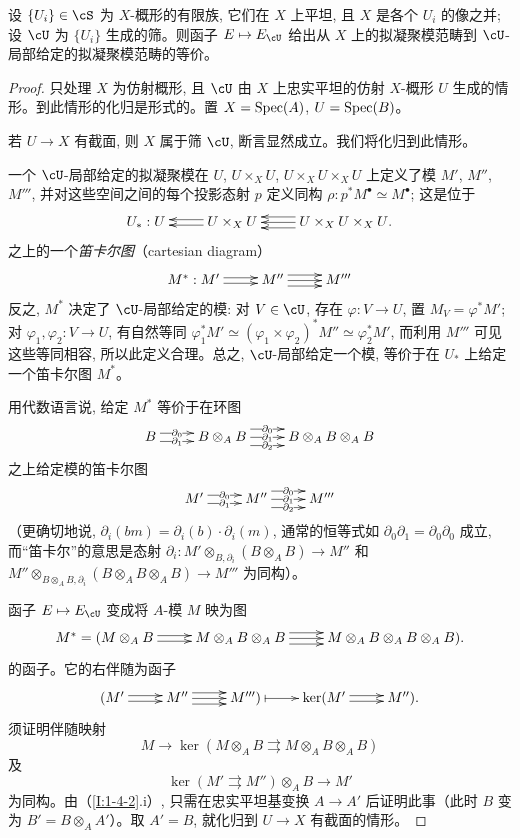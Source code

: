 \begin{theorem}\label{I:1-4-5}
设 $\{U_i\}\in\cS$ 为 $X$-概形的有限族, 它们在 $X$ 上平坦, 且 $X$ 是各个 $U_i$ 的像之并; 设 $\cU$ 为 $\{U_i\}$ 生成的筛。则函子 $E\mapsto E_\cU$ 给出从 $X$ 上的拟凝聚模范畴到 $\cU$-局部给定的拟凝聚模范畴的等价。
\end{theorem}
\begin{proof}
只处理 $X$ 为仿射概形, 且 $\cU$ 由 $X$ 上忠实平坦的仿射 $X$-概形 $U$ 生成的情形。到此情形的化归是形式的。置 $X=\operatorname{Spec}(A)$, $U=\operatorname{Spec}(B)$。

若 $U\to X$ 有截面, 则 $X$ 属于筛 $\cU$, 断言显然成立。我们将化归到此情形。

一个 $\cU$-局部给定的拟凝聚模在 $U$, $U\times_XU$, $U\times_XU\times_XU$ 上定义了模 $M'$, $M''$, $M'''$, 并对这些空间之间的每个投影态射 $p$ 定义同构 $\rho:p^*M^\bullet\simeq M^\bullet$; 这是位于
\[\xymatrix{
  U_* : U
    & U\times_X U \ar@<2pt>[l] \ar@<-2pt>[l]
    & U\times_X U\times_X U \ar[l] \ar@<4pt>[l] \ar@<-4pt>[l] \mbox{.}
}\]
之上的一个\emph{笛卡尔图}（cartesian diagram）
\[\xymatrix{
  M^* : M' \ar@<2pt>[r] \ar@<-2pt>[r]
    & M'' \ar[r] \ar@<4pt>[r] \ar@<-4pt>[r]
    & M'''
}\]
反之, $M^*$ 决定了 $\cU$-局部给定的模: 对 $V\in\cU$, 存在 $\varphi:V\to U$, 置 $M_V=\varphi^*M'$; 对 $\varphi_1,\varphi_2:V\to U$, 有自然等同 $\varphi_1^*M'\simeq(\varphi_1\times\varphi_2)^*M''\simeq\varphi_2^*M'$, 而利用 $M'''$ 可见这些等同相容, 所以此定义合理。总之, $\cU$-局部给定一个模, 等价于在 $U_*$ 上给定一个笛卡尔图 $M^*$。

用代数语言说, 给定 $M^*$ 等价于在环图
\[\xymatrix{
  B \ar@<3pt>[r]|-{\partial_0} \ar@<-3pt>[r]|-{\partial_1}
    & B\otimes_A B \ar@<6pt>[r]|-{\partial_0} \ar[r]|-{\partial_1} \ar@<-6pt>[r]|-{\partial_2}
    & B\otimes_A B\otimes_A B
}\]
之上给定模的笛卡尔图
\[\xymatrix{
  M' \ar@<3pt>[r]|-{\partial_0} \ar@<-3pt>[r]|-{\partial_1}
    & M'' \ar@<6pt>[r]|-{\partial_0} \ar[r]|-{\partial_1} \ar@<-6pt>[r]|-{\partial_2}
    & M'''
}\]
（更确切地说, $\partial_i(bm)=\partial_i(b)\cdot\partial_i(m)$, 通常的恒等式如 $\partial_0\partial_1=\partial_0\partial_0$ 成立, 而“笛卡尔”的意思是态射 $\partial_i:M'\otimes_{B,\partial_i}(B\otimes_A B)\to M''$ 和 $M''\otimes_{B\otimes_A B,\partial_i}(B\otimes_A B\otimes_A B)\to M'''$ 为同构）。

函子 $E\mapsto E_\cU$ 变成将 $A$-模 $M$ 映为图
\[\xymatrix{
  M^* = (M\otimes_A B \ar@<2pt>[r] \ar@<-2pt>[r]
    & M\otimes_A B\otimes_A B \ar@<-4pt>[r] \ar[r] \ar@<4pt>[r]
    & M\otimes_A B\otimes_A B\otimes_A B)\text{.}
}\]
的函子。它的右伴随为函子
\[\xymatrix{
  (M' \ar@<2pt>[r] \ar@<-2pt>[r]
    & M'' \ar@<-4pt>[r] \ar[r] \ar@<4pt>[r]
    & M''') \ar@{|->}[r]
    & \ker(M' \ar@<2pt>[r] \ar@<-2pt>[r]
    & M'')\text{.}
}\]
须证明伴随映射
\[
  M \to\ker(M\otimes_A B\rightrightarrows M\otimes_A B\otimes_A B)
\]
及
\[
  \ker(M'\rightrightarrows M'')\otimes_A B \to M'
\]
为同构。由（\ref{I:1-4-2}.i）, 只需在忠实平坦基变换 $A\to A'$ 后证明此事（此时 $B$ 变为 $B'=B\otimes_AA'$）。取 $A'=B$, 就化归到 $U\to X$ 有截面的情形。
\end{proof}

